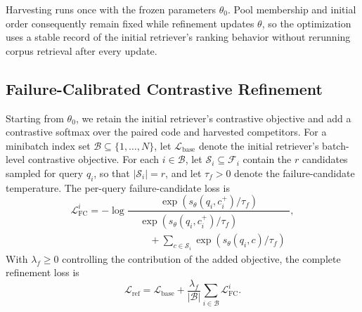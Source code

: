 \documentclass[11pt]{article}
\begin{document}
Harvesting runs once with the frozen parameters \(\theta_0\). Pool membership and initial order consequently remain fixed while refinement updates \(\theta\), so the optimization uses a stable record of the initial retriever's ranking behavior without rerunning corpus retrieval after every update.

\subsection{Failure-Calibrated Contrastive Refinement}
\label{sec:failure_refinement}

Starting from \(\theta_0\), we retain the initial retriever's contrastive objective and add a contrastive softmax over the paired code and harvested competitors. For a minibatch index set \(\mathcal{B}\subseteq\{1,\ldots,N\}\), let \(\mathcal{L}_{\mathrm{base}}\) denote the initial retriever's batch-level contrastive objective. For each \(i\in\mathcal{B}\), let \(\mathcal{S}_i\subseteq\mathcal{F}_i\) contain the \(r\) candidates sampled for query \(q_i\), so that \(|\mathcal{S}_i|=r\), and let \(\tau_f>0\) denote the failure-candidate temperature. The per-query failure-candidate loss is
\begin{equation}
  \mathcal{L}_{\mathrm{FC}}^{i}
  =-\log
  \frac{\exp(s_\theta(q_i,c_i^+)/\tau_f)}
  {\begin{aligned}
     &\exp(s_\theta(q_i,c_i^+)/\tau_f) \\
     &\quad+\sum_{c\in\mathcal{S}_i}
       \exp(s_\theta(q_i,c)/\tau_f)
   \end{aligned}},
  \label{eq:fc_loss}
\end{equation}
With \(\lambda_f\geq 0\) controlling the contribution of the added objective, the complete refinement loss is
\begin{equation}
  \mathcal{L}_{\mathrm{ref}}
  =\mathcal{L}_{\mathrm{base}}
  +\frac{\lambda_f}{|\mathcal{B}|}
   \sum_{i\in\mathcal{B}}\mathcal{L}_{\mathrm{FC}}^{i}.
  \label{eq:refinement_loss}
\end{equation}
\end{document}
